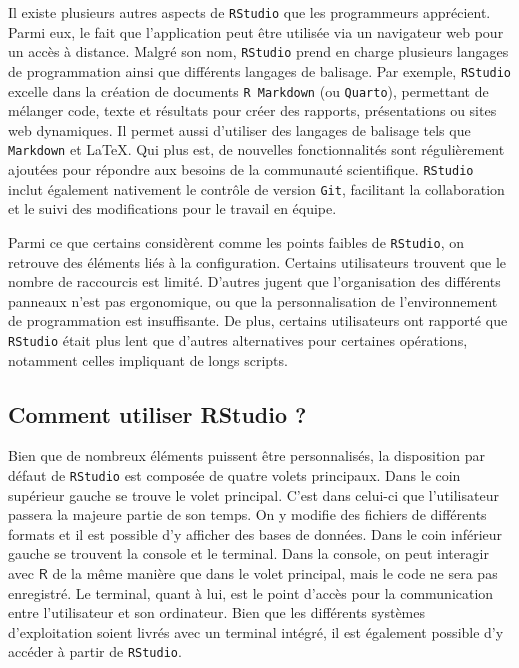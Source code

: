\documentclass[
  letterpaper,
  DIV=11,
  numbers=noendperiod,
  oneside]{scrreprt}
\begin{document}
Il existe plusieurs autres aspects de \texttt{RStudio} que les
programmeurs apprécient. Parmi eux, le fait que l'application peut être
utilisée via un navigateur web pour un accès à distance. Malgré son nom,
\texttt{RStudio} prend en charge plusieurs langages de programmation
ainsi que différents langages de balisage. Par exemple, \texttt{RStudio}
excelle dans la création de documents \texttt{R\ Markdown} (ou
\texttt{Quarto}), permettant de mélanger code, texte et résultats pour
créer des rapports, présentations ou sites web dynamiques. Il permet
aussi d'utiliser des langages de balisage tels que \texttt{Markdown} et
\LaTeX. Qui plus est, de nouvelles fonctionnalités sont régulièrement
ajoutées pour répondre aux besoins de la communauté scientifique.
\texttt{RStudio} inclut également nativement le contrôle de version
\texttt{Git}, facilitant la collaboration et le suivi des modifications
pour le travail en équipe.

Parmi ce que certains considèrent comme les points faibles de
\texttt{RStudio}, on retrouve des éléments liés à la configuration.
Certains utilisateurs trouvent que le nombre de raccourcis est limité.
D'autres jugent que l'organisation des différents panneaux n'est pas
ergonomique, ou que la personnalisation de l'environnement de
programmation est insuffisante. De plus, certains utilisateurs ont
rapporté que \texttt{RStudio} était plus lent que d'autres alternatives
pour certaines opérations, notamment celles impliquant de longs scripts.

\hypertarget{comment-utiliser-rstudio}{%
\subsection{Comment utiliser RStudio ?}\label{comment-utiliser-rstudio}}

Bien que de nombreux éléments puissent être personnalisés, la
disposition par défaut de \texttt{RStudio} est composée de quatre volets
principaux. Dans le coin supérieur gauche se trouve le volet principal.
C'est dans celui-ci que l'utilisateur passera la majeure partie de son
temps. On y modifie des fichiers de différents formats et il est
possible d'y afficher des bases de données. Dans le coin inférieur
gauche se trouvent la console et le terminal. Dans la console, on peut
interagir avec \(\textsf{R}\) de la même manière que dans le volet
principal, mais le code ne sera pas enregistré. Le terminal, quant à
lui, est le point d'accès pour la communication entre l'utilisateur et
son ordinateur. Bien que les différents systèmes d'exploitation soient
livrés avec un terminal intégré, il est également possible d'y accéder à
partir de \texttt{RStudio}.
\end{document}
